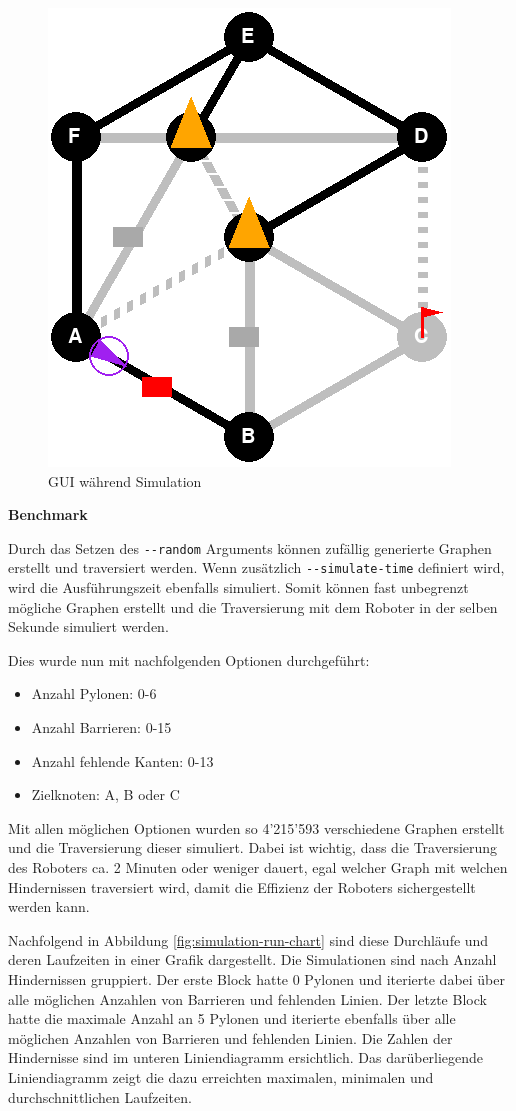 \begin{figure}[H]
    \centering
    \includegraphics[width=0.5\linewidth]{assets//informatik-prototyp//simulator/simulator-run.png}
    \caption{GUI während Simulation}
    \label{fig:simulation-run}
\end{figure}

\textbf{Benchmark}

Durch das Setzen des \verb|--random| Arguments können zufällig generierte Graphen erstellt und traversiert werden.
Wenn zusätzlich \verb|--simulate-time| definiert wird, wird die Ausführungszeit ebenfalls simuliert.
Somit können fast unbegrenzt mögliche Graphen erstellt und die Traversierung mit dem Roboter in der selben Sekunde simuliert werden.

Dies wurde nun mit nachfolgenden Optionen durchgeführt:

\begin{itemize}
  \item Anzahl Pylonen: 0-6
  \item Anzahl Barrieren: 0-15
  \item Anzahl fehlende Kanten: 0-13
  \item Zielknoten: A, B oder C
\end{itemize}

Mit allen möglichen Optionen wurden so 4'215'593 verschiedene Graphen erstellt und die Traversierung dieser simuliert.
Dabei ist wichtig, dass die Traversierung des Roboters ca. 2 Minuten oder weniger dauert, egal welcher Graph mit welchen Hindernissen traversiert wird, damit die Effizienz der Roboters sichergestellt werden kann.

Nachfolgend in Abbildung \ref{fig:simulation-run-chart} sind diese Durchläufe und deren Laufzeiten in einer Grafik dargestellt. Die Simulationen sind nach Anzahl Hindernissen gruppiert. Der erste Block hatte 0 Pylonen und iterierte dabei über alle möglichen Anzahlen von Barrieren und fehlenden Linien. Der letzte Block hatte die maximale Anzahl an 5 Pylonen und iterierte ebenfalls über alle möglichen Anzahlen von Barrieren und fehlenden Linien.
Die Zahlen der Hindernisse sind im unteren Liniendiagramm ersichtlich. Das darüberliegende Liniendiagramm zeigt die dazu erreichten maximalen, minimalen und durchschnittlichen Laufzeiten.

